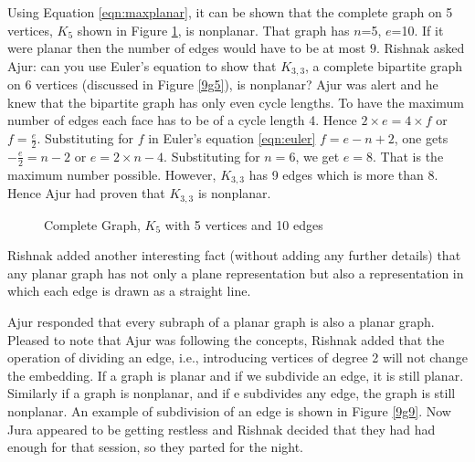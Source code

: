 Using Equation \ref{eqn:maxplanar}, it can be shown that the complete graph on 5 vertices, $K_5$ shown in Figure \ref{9g10}, is nonplanar. That graph has $n$=5, $e$=10. If it were planar then the number of edges would have to be at most $9$. 
Rishnak asked Ajur: can you use Euler's equation to show that $K_{3,3}$, a complete bipartite graph on 6 vertices (discussed in Figure \ref{9g5}), is nonplanar? 
Ajur was alert and he knew that the bipartite graph has only even cycle lengths. To have the maximum number of edges each face has to be of a cycle length 4. Hence $2\times e =4 \times f$ or $f=\frac{e}{2}$. Substituting for $f$ in Euler's equation \ref{eqn:euler}
$f=e-n+2$, one gets $-\frac{e}{2}=n-2$ or $e=2\times n -4$. Substituting for $n=6$, we get $e=8$. That is the maximum number possible. However, $K_{3,3}$ has 9 edges which is more than 8. Hence Ajur had proven that $K_{3,3}$ is nonplanar.
\begin{figure}
\begin{center}
\caption{ Complete Graph, $K_5$ with 5 vertices and 10 edges }\label{9g10}
\end{center}
\end{figure}
Rishnak added another interesting fact (without adding any further details) that any planar graph has not only a plane representation but also a representation in which each edge is drawn as a straight line.

Ajur responded that every subraph of a planar graph is also a planar graph. Pleased to note that Ajur was following the concepts, Rishnak added that the operation of dividing an edge, i.e., introducing vertices of degree 2 will not change the embedding. If a graph is planar and if we subdivide an edge, it is still planar. Similarly if a graph is nonplanar, and if e subdivides any edge, the graph is still nonplanar. An example of subdivision of an edge is shown in Figure \ref{9g9}. Now Jura appeared to be getting restless and Rishnak decided that they had had enough for that session, so they parted for the night.

